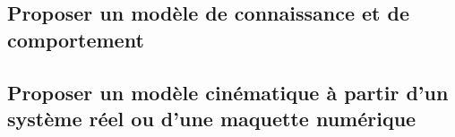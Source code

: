 
\proffalse
\begin{multicols}{2}
\section{Proposer un modèle de connaissance et de comportement}
\subsection{Proposer un modèle cinématique à partir d'un système réel ou d'une maquette numérique}


\renewcommand{\repExo}{../../ExercicesCompetences/B2_ProposerModele/B2_12_ModeliserSchemaCinematiques}
\renewcommand{\td}{01_T}
\graphicspath{{\repStyle/png/}{\repExo/\td/images/}}


\renewcommand{\td}{02_R}
\graphicspath{{\repStyle/png/}{\repExo/\td/images/}}


\renewcommand{\td}{03_TT}
\graphicspath{{\repStyle/png/}{\repExo/\td/images/}}


\renewcommand{\td}{04_RR}
\graphicspath{{\repStyle/png/}{\repExo/\td/images/}}


\renewcommand{\td}{05_RT}
\graphicspath{{\repStyle/png/}{\repExo/\td/images/}}


\renewcommand{\td}{06_TR}
\graphicspath{{\repStyle/png/}{\repExo/\td/images/}}


\renewcommand{\td}{07_RR3D}
\graphicspath{{\repStyle/png/}{\repExo/\td/images/}}


\renewcommand{\td}{08_RR3D}
\graphicspath{{\repStyle/png/}{\repExo/\td/images/}}


\renewcommand{\td}{09_RT_RSG}
\graphicspath{{\repStyle/png/}{\repExo/\td/images/}}


\renewcommand{\td}{10_PompePalette}
\graphicspath{{\repStyle/png/}{\repExo/\td/images/}}


\renewcommand{\td}{11_PompePistonsRadiaux}
\graphicspath{{\repStyle/png/}{\repExo/\td/images/}}


\renewcommand{\td}{12_BielleManivelle}
\graphicspath{{\repStyle/png/}{\repExo/\td/images/}}


\renewcommand{\td}{13_TransfoMouvement}
\graphicspath{{\repStyle/png/}{\repExo/\td/images/}}



\end{multicols}
